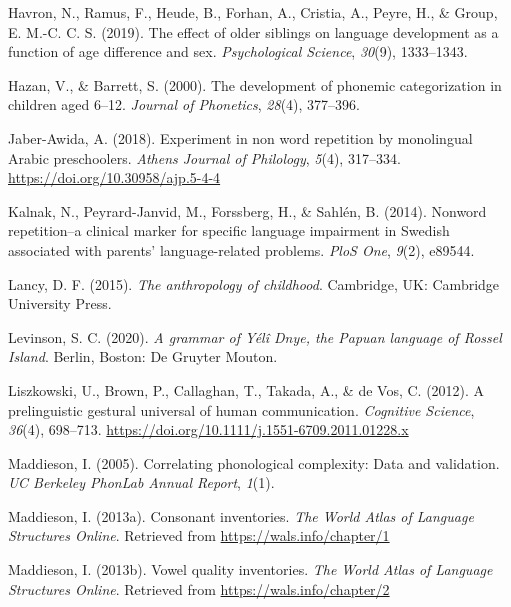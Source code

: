 \documentclass[english,,man,floatsintext]{apa6}
\begin{document}
\leavevmode\hypertarget{ref-havron2019effect}{}%
Havron, N., Ramus, F., Heude, B., Forhan, A., Cristia, A., Peyre, H., \& Group, E. M.-C. C. S. (2019). The effect of older siblings on language development as a function of age difference and sex. \emph{Psychological Science}, \emph{30}(9), 1333--1343.

\leavevmode\hypertarget{ref-hazan2000development}{}%
Hazan, V., \& Barrett, S. (2000). The development of phonemic categorization in children aged 6--12. \emph{Journal of Phonetics}, \emph{28}(4), 377--396.

\leavevmode\hypertarget{ref-jabere2018xperiment}{}%
Jaber-Awida, A. (2018). Experiment in non word repetition by monolingual Arabic preschoolers. \emph{Athens Journal of Philology}, \emph{5}(4), 317--334. \url{https://doi.org/10.30958/ajp.5-4-4}

\leavevmode\hypertarget{ref-kalnak2014nonword}{}%
Kalnak, N., Peyrard-Janvid, M., Forssberg, H., \& Sahlén, B. (2014). Nonword repetition--a clinical marker for specific language impairment in Swedish associated with parents' language-related problems. \emph{PloS One}, \emph{9}(2), e89544.

\leavevmode\hypertarget{ref-lancy2015anthropology}{}%
Lancy, D. F. (2015). \emph{The anthropology of childhood}. Cambridge, UK: Cambridge University Press.

\leavevmode\hypertarget{ref-levinsonYDgrammar}{}%
Levinson, S. C. (2020). \emph{A grammar of Yélî Dnye, the Papuan language of Rossel Island}. Berlin, Boston: De Gruyter Mouton.

\leavevmode\hypertarget{ref-liszkowski2012prelinguistic}{}%
Liszkowski, U., Brown, P., Callaghan, T., Takada, A., \& de Vos, C. (2012). A prelinguistic gestural universal of human communication. \emph{Cognitive Science}, \emph{36}(4), 698--713. \url{https://doi.org/10.1111/j.1551-6709.2011.01228.x}

\leavevmode\hypertarget{ref-maddieson2005correlating}{}%
Maddieson, I. (2005). Correlating phonological complexity: Data and validation. \emph{UC Berkeley PhonLab Annual Report}, \emph{1}(1).

\leavevmode\hypertarget{ref-maddieson2013consonant}{}%
Maddieson, I. (2013a). Consonant inventories. \emph{The World Atlas of Language Structures Online}. Retrieved from \url{https://wals.info/chapter/1}

\leavevmode\hypertarget{ref-maddieson2013vowel}{}%
Maddieson, I. (2013b). Vowel quality inventories. \emph{The World Atlas of Language Structures Online}. Retrieved from \url{https://wals.info/chapter/2}
\end{document}
